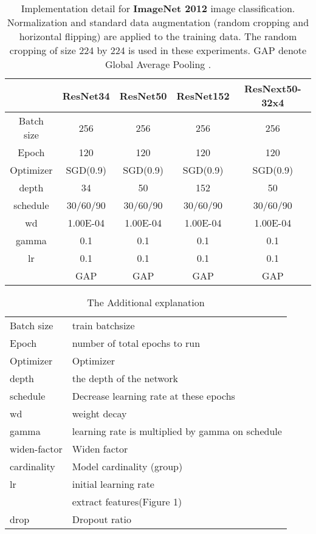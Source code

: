 \documentclass[letterpaper]{article} \usepackage{aaai20}  \usepackage{times}  \usepackage{helvet} \usepackage{courier}  \usepackage[hyphens]{url}  \usepackage{graphicx} \urlstyle{rm} \def\UrlFont{\rm}  \usepackage{graphicx}  \frenchspacing  \setlength{\pdfpagewidth}{8.5in}  \setlength{\pdfpageheight}{11in}  \usepackage{color}
\begin{document}
	\begin{table*}[htbp]
		
		\centering
		\begin{tabular}{|c|c|c|c|c|}
			\toprule
			& ResNet34 & ResNet50 & ResNet152 & ResNext50-32x4 \\
			\midrule
			Batch size & 256   & 256   & 256   & 256 \\
			Epoch & 120   & 120   & 120   & 120 \\
			Optimizer & SGD(0.9) & SGD(0.9) & SGD(0.9) & SGD(0.9) \\
			depth & 34    & 50    & 152   & 50 \\
			schedule & 30/60/90 & 30/60/90 & 30/60/90 & 30/60/90 \\
			wd    & 1.00E-04 & 1.00E-04 & 1.00E-04 & 1.00E-04 \\
			gamma & 0.1   & 0.1   & 0.1   & 0.1 \\
lr    & 0.1   & 0.1   & 0.1   & 0.1 \\
			 & GAP   & GAP   & GAP   & GAP \\
			\bottomrule
		\end{tabular}\caption{Implementation detail for \textbf{ImageNet 2012} image classification. Normalization and standard data augmentation (random cropping and horizontal flipping) are applied to the training data. The random cropping of size 224 by 224 is used in these experiments. GAP denote Global Average Pooling .}
		\vspace{-0.18cm}
			\label{tab:imagenet}\end{table*}

	\begin{table*}[htbp]
		\small
		\centering
		\begin{tabular}{|l|l|}
			\toprule
			Batch size & train batchsize \\
			Epoch & number of total epochs to run \\
			Optimizer & Optimizer \\
			depth & the depth of the network \\
			schedule & Decrease learning rate at these epochs \\
			wd    & weight decay \\
			gamma & learning rate is multiplied by gamma on schedule \\
			widen-factor & Widen factor \\
			cardinality & Model cardinality (group) \\
			lr    & initial learning rate \\
			 &  extract features(Figure 1)\\
			drop  & Dropout ratio \\
			\bottomrule
		\end{tabular}\label{tab:addlabel}\caption{The Additional explanation}
		\vspace{-0.2cm}
	\end{table*}
\end{document}
